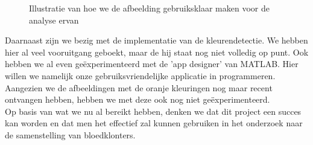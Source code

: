 \documentclass[a4paper,kulak]{kulakarticle}
\begin{document}
		\begin{figure}[H]
		\centering
		\qquad
		
		\caption{Illustratie van hoe we de afbeelding gebruiksklaar maken voor de analyse ervan}
		\label{fig: voorna}
		\end{figure}
		
		
		Daarnaast zijn we bezig met de implementatie van de kleurendetectie. We hebben hier al veel vooruitgang geboekt, maar de hij staat nog niet volledig op punt. Ook hebben we al even geëxperimenteerd met de 'app designer' van MATLAB. Hier willen we namelijk onze gebruiksvriendelijke applicatie in programmeren.\\
		Aangezien we de afbeeldingen met de oranje kleuringen nog maar recent ontvangen hebben, hebben we met deze ook nog niet geëxperimenteerd.\\
		Op basis van wat we nu al bereikt hebben, denken we dat dit project een succes kan worden en dat men het effectief zal kunnen gebruiken in het onderzoek naar de samenstelling van bloedklonters.
	
\end{document}
